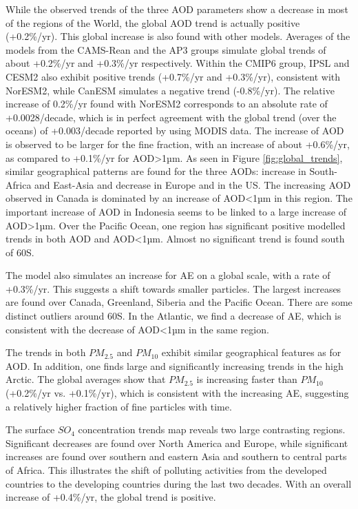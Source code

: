 \documentclass[journal abbreviation, manuscript]{copernicus}
\begin{document}
While the observed trends of the three AOD parameters show a decrease in most of the regions of the World, the global AOD trend is actually positive (+0.2\%/yr). This global increase is also found with other models. Averages of the models from the CAMS-Rean and the AP3 groups simulate global trends of about +0.2\%/yr and +0.3\%/yr respectively. Within the CMIP6 group, IPSL and CESM2 also exhibit positive trends (+0.7\%/yr and +0.3\%/yr), consistent with NorESM2, while CanESM simulates a negative trend (-0.8\%/yr). The relative increase of 0.2\%/yr found with NorESM2 corresponds to an absolute rate of +0.0028/decade, which is in perfect agreement with the global trend (over the oceans) of +0.003/decade reported by \cite{zhang2010decadal} using MODIS data. The increase of AOD is observed to be larger for the fine fraction, with an increase of about +0.6\%/yr, as compared to +0.1\%/yr for AOD>1µm. As seen in Figure \ref{fig:global_trends}, similar geographical patterns are found for the three AODs: increase in South-Africa and East-Asia and decrease in Europe and in the US. The increasing AOD observed in Canada is dominated by an increase of AOD<1µm in this region. The important increase of AOD in Indonesia seems to be linked to a large increase of AOD>1µm. Over the Pacific Ocean, one region has significant positive modelled trends in both AOD and AOD<1µm. Almost no significant trend is found south of 60\textdegree S.

The model also simulates an increase for AE on a global scale, with a rate of +0.3\%/yr. This suggests a shift towards smaller particles. The largest increases are found over Canada, Greenland, Siberia and the Pacific Ocean. There are some distinct outliers around 60\textdegree S. In the Atlantic, we find a decrease of AE, which is consistent with the decrease of AOD<1µm in the same region.

The trends in both $PM_{2.5}$ and $PM_{10}$ exhibit similar geographical features as for AOD. In addition, one finds large and significantly increasing trends in the high Arctic. The global averages show that $PM_{2.5}$ is increasing faster than $PM_{10}$  (+0.2\%/yr vs. +0.1\%/yr), which is consistent with the increasing AE, suggesting a relatively higher fraction of fine particles with time.

The surface $SO_{4}$ concentration trends map reveals two large contrasting regions. Significant decreases are found over North America and Europe, while significant increases are found over southern and eastern Asia and southern to central parts of Africa. This illustrates the shift of polluting activities from the developed countries to the developing countries during the last two decades. With an overall increase of +0.4\%/yr, the global trend is positive.
\end{document}
